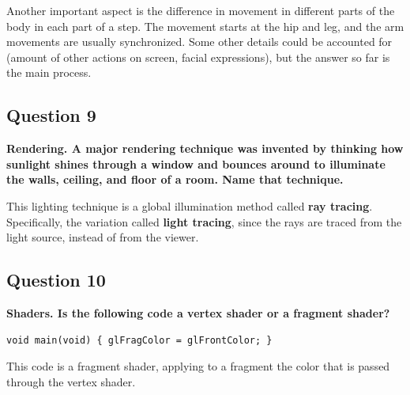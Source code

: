 \documentclass[12pt]{article}
\begin{document}
Another important aspect is the difference in movement in different parts of the body in each part of a step. The movement starts at the hip and leg, and the arm movements are usually synchronized. Some other details could be accounted for (amount of other actions on screen, facial expressions), but the answer so far is the main process.

\subsection*{Question 9}
{\bfseries Rendering. A major rendering technique was invented by thinking how sunlight shines through a window and bounces around to illuminate the walls, ceiling, and floor of a room. Name that technique.}

This lighting technique is a global illumination method called \textbf{ray tracing}. Specifically, the variation called \textbf{light tracing}, since the rays are traced from the light source, instead of from the viewer.

\subsection*{Question 10}
{\bfseries Shaders. Is the following code a vertex shader or a fragment shader?
\begin{verbatim}
void main(void) { glFragColor = glFrontColor; }    
\end{verbatim}
}

This code is a fragment shader, applying to a fragment the color that is passed through the vertex shader.
\end{document}
